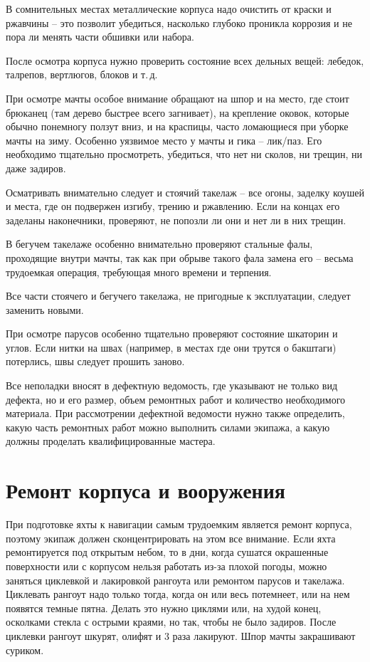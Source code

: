 \documentclass[a4paper, 12pt, twoside, final]{scrbook}
\begin{document}
В сомнительных местах металлические корпуса надо очистить от краски и ржавчины \--- это позволит убедиться, насколько глубоко проникла коррозия и не пора ли менять части обшивки или набора.

После осмотра корпуса нужно проверить состояние всех дельных вещей: лебедок, талрепов, вертлюгов, блоков и т.\,д.

При осмотре мачты особое внимание обращают на шпор и на место, где стоит брюканец (там дерево быстрее всего загнивает), на крепление оковок, которые обычно понемногу ползут вниз, и на краспицы, часто ломающиеся при уборке мачты на зиму. Особенно уязвимое место у мачты и гика \--- лик\-/паз. Его необходимо тщательно просмотреть, убедиться, что нет ни сколов, ни трещин, ни даже задиров.

Осматривать внимательно следует и стоячий такелаж \--- все огоны, заделку коушей и места, где он подвержен изгибу, трению и ржавлению. Если на концах его заделаны наконечники, проверяют, не попозли ли они и нет ли в них трещин.

В бегучем такелаже особенно внимательно проверяют стальные фалы, проходящие внутри мачты, так как при обрыве такого фала замена его \--- весьма трудоемкая операция, требующая много времени и терпения.

Все части стоячего и бегучего такелажа, не пригодные к эксплуатации, следует заменить новыми.

При осмотре парусов особенно тщательно проверяют состояние шкаторин и углов. Если нитки на швах (например, в местах где они трутся о бакштаги) потерлись, швы следует прошить заново.

Все неполадки вносят в дефектную ведомость, где указывают не только вид дефекта, но и его размер, объем ремонтных работ и количество необходимого материала. При рассмотрении дефектной ведомости нужно также определить, какую часть ремонтных работ можно выполнить силами экипажа, а какую должны проделать квалифицированные мастера.

\section{Ремонт корпуса и вооружения}

При подготовке яхты к навигации самым трудоемким является ремонт корпуса, поэтому экипаж должен сконцентрировать на этом все внимание. Если яхта ремонтируется под открытым небом, то в дни, когда сушатся окрашенные поверхности или с корпусом нельзя работать из-за плохой погоды, можно заняться циклевкой и лакировкой рангоута или ремонтом парусов и такелажа. Циклевать рангоут надо только тогда, когда он или весь потемнеет, или на нем появятся темные пятна. Делать это нужно циклями или, на худой конец, осколками стекла с острыми краями, но так, чтобы не было задиров. После циклевки рангоут шкурят, олифят и 3 раза лакируют. Шпор мачты закрашивают суриком.
\end{document}
